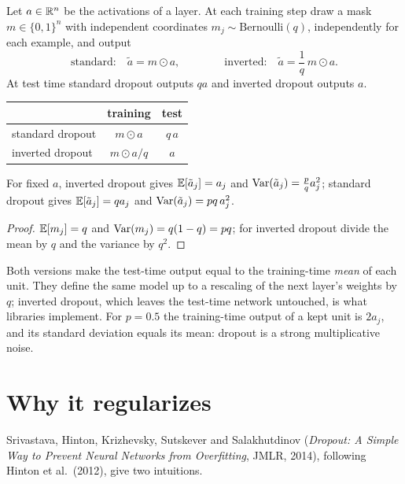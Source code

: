 \begin{notechapter}
\begin{definition}[Dropout]\label{dropout:def:dropout}
Let $a\in\mathbb{R}^n$ be the activations of a layer. At each training step draw a mask $m\in\{0,1\}^n$ with
independent coordinates $m_j\sim\mathrm{Bernoulli}(q)$, independently for each example, and output
\[
  \text{standard:}\quad\tilde a = m\odot a,\qquad\qquad\text{inverted:}\quad\tilde a = \frac1q\,m\odot a .
\]
At test time standard dropout outputs $qa$ and inverted dropout outputs $a$.
\end{definition}

\begin{center}
\begin{tabular}{lcc}
\toprule
& training & test \\
\midrule
standard dropout & $m\odot a$ & $q\,a$ \\
inverted dropout & $m\odot a/q$ & $a$ \\
\bottomrule
\end{tabular}
\end{center}

\begin{proposition}[Moments]\label{dropout:prop:moments}
For fixed $a$, inverted dropout gives $\mathbb{E}[\tilde a_j] = a_j$ and $\operatorname{Var}(\tilde a_j) = \frac pqa_j^2$; standard dropout gives
$\mathbb{E}[\tilde a_j] = qa_j$ and $\operatorname{Var}(\tilde a_j) = pq\,a_j^2$.
\end{proposition}

\begin{proof}
$\mathbb{E}[m_j] = q$ and $\operatorname{Var}(m_j) = q(1 - q) = pq$; for inverted dropout divide the mean by $q$ and the variance by $q^2$.
\end{proof}

Both versions make the test-time output equal to the training-time \emph{mean} of each unit.
They define the same model up to a rescaling of the next layer's weights by $q$; inverted
dropout, which leaves the test-time network untouched, is what libraries implement. For
$p = 0.5$ the training-time output of a kept unit is $2a_j$, and its standard deviation equals its
mean: dropout is a strong multiplicative noise.

\section{Why it regularizes}\label{dropout:sec:why}

Srivastava, Hinton, Krizhevsky, Sutskever and Salakhutdinov (\emph{Dropout: A Simple Way to
Prevent Neural Networks from Overfitting}, JMLR, 2014), following Hinton et al.\ (2012),
give two intuitions.


\end{notechapter}

